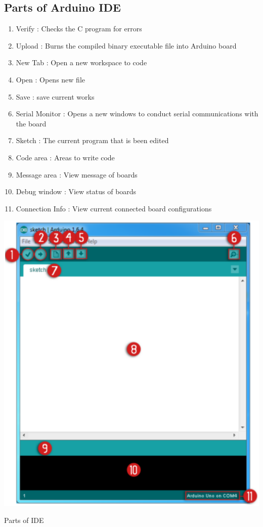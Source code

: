\subsection{Parts of Arduino IDE}

\begin{enumerate}
    \item Verify : Checks the C program for errors
    \item Upload : Burns the compiled binary executable file into Arduino board
    \item New Tab : Open a new workspace to code
    \item Open : Opens new file
    \item Save : save current works
    \item Serial Monitor : Opens a new windows to conduct serial communications with the board
    \item Sketch : The current program that is been edited
    \item Code area : Areas to write code
    \item Message area : View message of boards
    \item Debug window : View status of boards
    \item Connection Info : View current connected board configurations
\end{enumerate}

\begin{marginfigure}
	\raggedright
    \vspace{-9cm} \includegraphics{Images/Programing_Arduino/ide_parts.png}
    \captionsetup{type=figure}
    \caption{Parts of \ac{IDE}}
\end{marginfigure}


